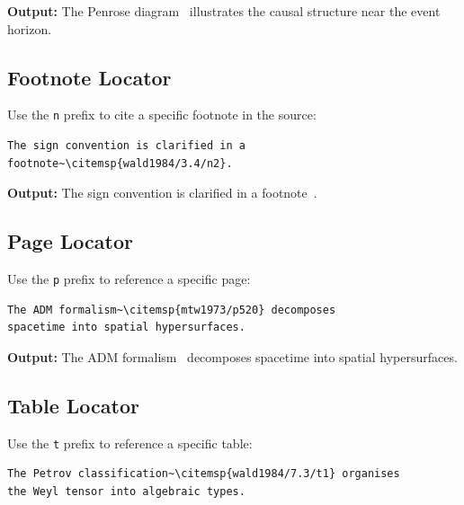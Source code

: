 \documentclass[11pt, a4paper]{article}
\begin{document}
\noindent\textbf{Output:} The Penrose diagram~ illustrates the causal structure near the event horizon.


\subsection{Footnote Locator}

Use the \texttt{n} prefix to cite a specific footnote in the source:

\begin{tcolorbox}[colback=blue!3, colframe=blue!30, boxrule=0.5pt, arc=2pt, top=6pt, bottom=6pt, left=10pt, right=10pt]
\begin{verbatim}
The sign convention is clarified in a
footnote~\citemsp{wald1984/3.4/n2}.
\end{verbatim}
\end{tcolorbox}

\noindent\textbf{Output:} The sign convention is clarified in a footnote~.


\subsection{Page Locator}

Use the \texttt{p} prefix to reference a specific page:

\begin{tcolorbox}[colback=blue!3, colframe=blue!30, boxrule=0.5pt, arc=2pt, top=6pt, bottom=6pt, left=10pt, right=10pt]
\begin{verbatim}
The ADM formalism~\citemsp{mtw1973/p520} decomposes
spacetime into spatial hypersurfaces.
\end{verbatim}
\end{tcolorbox}

\noindent\textbf{Output:} The ADM formalism~ decomposes spacetime into spatial hypersurfaces.


\subsection{Table Locator}

Use the \texttt{t} prefix to reference a specific table:

\begin{tcolorbox}[colback=blue!3, colframe=blue!30, boxrule=0.5pt, arc=2pt, top=6pt, bottom=6pt, left=10pt, right=10pt]
\begin{verbatim}
The Petrov classification~\citemsp{wald1984/7.3/t1} organises
the Weyl tensor into algebraic types.
\end{verbatim}
\end{tcolorbox}
\end{document}
